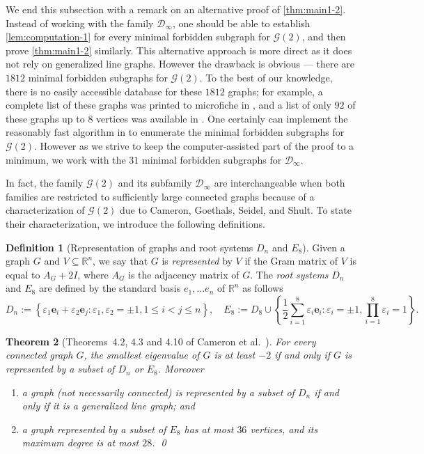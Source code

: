 \documentclass[11pt]{article}
\newtheorem{theorem}{Theorem}[section]
\theoremstyle{definition}
\newtheorem{definition}[theorem]{Definition}
\theoremstyle{remark}
\newcommand{\dset}[2]{\left\{{#1}\colon{#2}\right\}}
\newcommand{\eps}{\varepsilon}
\newcommand{\D}{\mathcal{D}}
\newcommand{\G}{\mathcal{G}}
\newcommand{\R}{\mathbb{R}}
\begin{document}
We end this subsection with a remark on an alternative proof of \cref{thm:main1-2}. Instead of working with the family $\D_\infty$, one should be able to establish \cref{lem:computation-1} for every minimal forbidden subgraph for $\G(2)$, and then prove \cref{thm:main1-2} similarly. This alternative approach is more direct as it does not rely on generalized line graphs. However the drawback is obvious --- there are $1812$ minimal forbidden subgraphs for $\G(2)$. To the best of our knowledge, there is no easily accessible database for these $1812$ graphs; for example, a complete list of these graphs was printed to microfiche in \cite{BN92}, and a list of only $92$ of these graphs up to $8$ vertices was available in \cite[Fig.~2.4 and Table~A1.2]{CRS04}. One certainly can implement the reasonably fast algorithm in \cite{BN92} to enumerate the minimal forbidden subgraphs for $\G(2)$. However as we strive to keep the computer-assisted part of the proof to a minimum, we work with the $31$ minimal forbidden subgraphs for $\D_\infty$.

In fact, the family $\G(2)$ and its subfamily $\D_\infty$ are interchangeable when both families are restricted to sufficiently large connected graphs because of a characterization of $\G(2)$ due to Cameron, Goethals, Seidel, and Shult. To state their characterization, we introduce the following definitions.

\begin{definition}[Representation of graphs and root systems $D_n$ and $E_8$] \label{def:dn-e8}
    Given a graph $G$ and $V \subseteq \R^n$, we say that $G$ is \emph{represented} by $V$ if the Gram matrix of $V$ is equal to $A_G + 2I$, where $A_G$ is the adjacency matrix of $G$. The \emph{root systems} $D_n$ and $E_8$ are defined by the standard basis $e_1, \dots e_n$ of $\R^n$ as follows
    \[
        D_n := \dset{\eps_1 \bm{e}_i + \eps_2 \bm{e}_j}{\eps_1, \eps_2 = \pm 1, 1 \le i < j \le n}, \quad E_8 := D_8 \cup \dset{\frac12\sum_{i=1}^8 \eps_i \bm{e}_i}{\eps_i = \pm 1, \prod_{i=1}^8 \eps_i = 1}.
    \]
\end{definition}

\begin{theorem}[Theorems~4.2, 4.3 and 4.10 of Cameron et al.~\cite{CGSS76}] \label{thm:cgss}
    For every connected graph $G$, the smallest eigenvalue of $G$ is at least $-2$ if and only if $G$ is represented by a subset of $D_n$ or $E_8$. Moreover
    \begin{enumerate}[label=(\alph*)]
        \item a graph (not necessarily connected) is represented by a subset of $D_n$ if and only if it is a generalized line graph; and \label{thm:cgss-dn}
        \item a graph represented by a subset of $E_8$ has at most $36$ vertices, and its maximum degree is at most $28$. \qed
    \end{enumerate}
\end{theorem}
\end{document}
